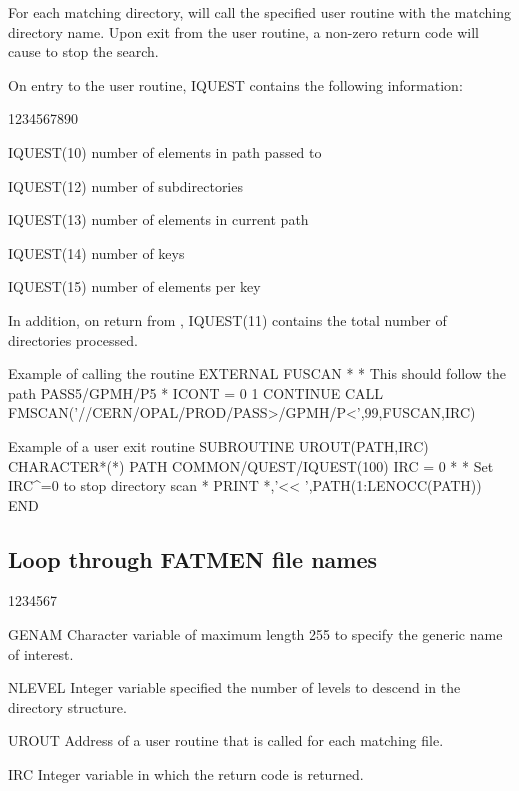 For each matching directory,  will call the specified user routine
with the matching directory name. Upon exit from the user routine, a non-zero
return code will cause  to stop the search.
\par
On entry to the user routine, IQUEST contains the following
information:
\begin{DLtt}{1234567890}
\item[IQUEST(10)]number of elements in path passed to 
\item[IQUEST(12)]number of subdirectories
\item[IQUEST(13)]number of elements in current path
\item[IQUEST(14)]number of keys
\item[IQUEST(15)]number of elements per key
\end{DLtt}
\par
In addition, on return from , IQUEST(11) contains the
total number of directories processed.
\begin{XMPt}{Example of calling the routine \protect{}}
      EXTERNAL FUSCAN
*
*     This should follow the path PASS5/GPMH/P5
*
      ICONT = 0
 1    CONTINUE
      CALL FMSCAN('//CERN/OPAL/PROD/PASS>/GPMH/P<',99,FUSCAN,IRC)
\end{XMPt}
\begin{XMPt}{Example of a user exit routine}
      SUBROUTINE UROUT(PATH,IRC)
      CHARACTER*(*) PATH
      COMMON/QUEST/IQUEST(100)
      IRC = 0
*
*     Set IRC^=0 to stop directory scan
*
      PRINT *,'<< ',PATH(1:LENOCC(PATH))
      END
\end{XMPt}
\subsection{Loop through FATMEN file names}
\begin{DLtt}{1234567}
\item[GENAM]
Character variable of maximum length 255 to specify the generic name of
interest.
\item[NLEVEL]
Integer variable specified the number of levels to descend in the directory
structure. 
\item[UROUT]
Address of a user routine that is called for each matching file.
\item[IRC]
Integer variable in which the return code is returned.
\end{DLtt}


